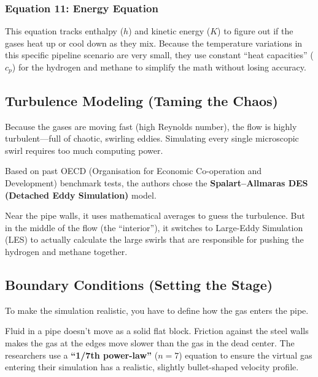 \documentclass[12pt,a4paper]{report}
\begin{document}
\subsubsection*{Equation 11: Energy Equation}

This equation tracks enthalpy ($h$) and kinetic energy ($K$) to figure out if the gases heat up or cool down as they mix. Because the temperature variations in this specific pipeline scenario are very small, they use constant ``heat capacities'' ($c_p$) for the hydrogen and methane to simplify the math without losing accuracy.

\subsection{Turbulence Modeling (Taming the Chaos)}

Because the gases are moving fast (high Reynolds number), the flow is highly turbulent---full of chaotic, swirling eddies. Simulating every single microscopic swirl requires too much computing power.

\begin{description}[style=nextline, font=\normalfont\bfseries, leftmargin=1.5em]

  \item[The Solution:]
  Based on past OECD (Organisation for Economic Co-operation and Development) benchmark tests, the authors chose the \textbf{Spalart--Allmaras DES (Detached Eddy Simulation)} model.

  \item[How it works:]
  Near the pipe walls, it uses mathematical averages to guess the turbulence. But in the middle of the flow (the ``interior''), it switches to Large-Eddy Simulation (LES) to actually calculate the large swirls that are responsible for pushing the hydrogen and methane together.

\end{description}

\subsection{Boundary Conditions (Setting the Stage)}

To make the simulation realistic, you have to define how the gas enters the pipe.

Fluid in a pipe doesn't move as a solid flat block. Friction against the steel walls makes the gas at the edges move slower than the gas in the dead center. The researchers use a \textbf{``1/7th power-law''} ($n=7$) equation to ensure the virtual gas entering their simulation has a realistic, slightly bullet-shaped velocity profile.
\end{document}

